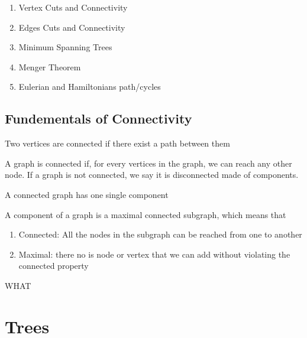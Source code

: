 \documentclass{article}
\begin{document}
\begin{enumerate}
    \item Vertex Cuts and Connectivity
    \item Edges Cuts and Connectivity
    \item Minimum Spanning Trees
    \item Menger Theorem
    \item Eulerian and Hamiltonians path/cycles
\end{enumerate}

\subsection{Fundementals of Connectivity}

\begin{definition}
    Two vertices are connected if there exist a path between them
\end{definition}

\begin{definition}
    A graph is connected if, for every vertices in the graph, we can
    reach any other node. If a graph is not connected, we say it is
    disconnected made of components.
\end{definition}

\begin{remark}
    A connected graph has one single component
\end{remark}

\begin{definition}
    A component of a graph is a maximal connected subgraph, which means
    that
    \begin{enumerate}
	\item Connected: All the nodes in the subgraph can be reached
	    from one to another
	\item Maximal: there no is node or vertex that we can add without
	    violating the connected property
    \end{enumerate}
\end{definition}

\begin{theorem}
    WHAT
\end{theorem}


\section{Trees}%
\label{sec:Trees}
\end{document}
